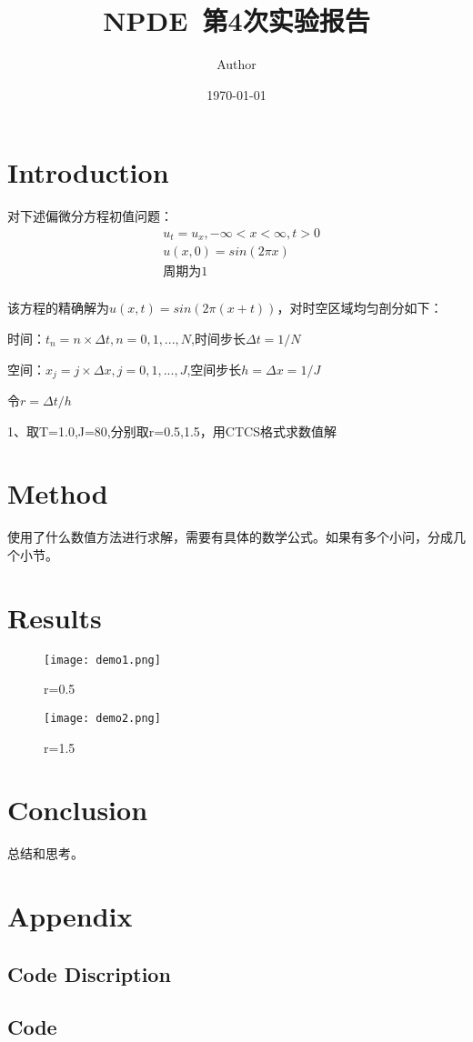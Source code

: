 \documentclass{article}
\title{NPDE~第4次实验报告}
\author{Author}
\date{\today}
\begin{document}
\maketitle

\section{Introduction}

对下述偏微分方程初值问题：
$$
\begin{aligned}
    &u_t=u_x,-\infty<x<\infty,t>0\\
    &u(x,0)=sin(2\pi x)\\
    &\text{周期为1}\\
\end{aligned}
$$

该方程的精确解为$u(x,t)=sin(2\pi(x+t))$，对时空区域均匀剖分如下：

时间：$t_n=n\times \Delta t,n=0,1,...,N$,时间步长$\Delta t=1/N$

空间：$x_j=j\times \Delta x,j=0,1,...,J$,空间步长$h=\Delta x=1/J$

令$r=\Delta t/h$

1、取T=1.0,J=80,分别取r=0.5,1.5，用CTCS格式求数值解
\section{Method}

使用了什么数值方法进行求解，需要有具体的数学公式。如果有多个小问，分成几个小节。


\section{Results}

\begin{figure}[H]
    \centering
    \texttt{[image: demo1.png]}
    \caption{r=0.5}\label{fig:demo1}
\end{figure}

\begin{figure}[H]
    \centering
    \texttt{[image: demo2.png]}
    \caption{r=1.5}\label{fig:demo2}
\end{figure}

\section{Conclusion}

总结和思考。

\section{Appendix}
\subsection{Code Discription}

\subsection{Code}


\end{document}

